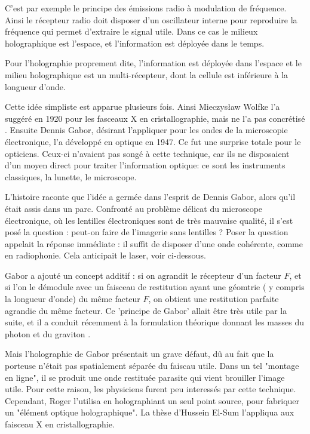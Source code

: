 \documentclass[a4paper,12pt]{article}
\begin{document}
C'est par exemple le principe des émissions radio à modulation de fréquence. Ainsi le récepteur radio doit disposer d'un oscillateur interne pour reproduire la fréquence qui permet d'extraire le signal utile. Dans ce cas le milieux holographique est l'espace, et l'information est déployée dans le temps.


Pour l'holographie proprement dite, l'information est déployée dans l'espace et le milieu holographique est un multi-récepteur, dont la cellule est inférieure à la longueur d'onde.


Cette idée simpliste est apparue plusieurs fois. Ainsi Mieczysław Wolfke l'a suggéré en 1920 pour les fasceaux X en cristallographie, mais ne l'a pas concrétisé \cite{Gabor}. Ensuite Dennis Gabor, désirant l'appliquer pour les ondes de la microscopie électronique, l'a développé en optique en 1947. Ce fut une surprise totale pour le opticiens. Ceux-ci n'avaient pas songé à cette technique, car ils ne disposaient d'un moyen direct pour traiter l'information optique: ce sont les instruments classiques, la lunette, le microscope.



L'histoire raconte que l'idée a germée dans l'esprit de Dennis Gabor, alors qu'il était assis dans un parc. Confronté au problème délicat du microscope électronique, où les lentilles électroniques sont de très mauvaise qualité, il s'est posé la question : peut-on faire de l'imagerie sans lentilles ? Poser la question appelait la réponse immédiate : il suffit de disposer d'une onde cohérente, comme en radiophonie. Cela anticipait le laser, voir ci-dessous.


Gabor a ajouté un concept additif : si on agrandit le récepteur d'un facteur $F$, et si l'on le démodule avec un faisceau de restitution ayant une géomtrie ( y compris la longueur d'onde) du même facteur $F$, on obtient une restitution parfaite agrandie du même facteur. Ce 'principe de Gabor' allait être très utile par la suite, et il a conduit récemment à la formulation théorique donnant les masses du photon et du graviton \cite{Sanchez}.



Mais l'holographie de Gabor présentait un grave défaut, dû au fait que la porteuse n'était pas spatialement séparée du faiscau utile. Dans un tel "montage en ligne", il se produit une onde restituée parasite qui vient brouiller l'image utile. Pour cette raison, les physiciens furent peu interessés par cette technique. Cependant, Roger l'utilisa en holographiant un seul point source, pour fabriquer un "élément optique holographique". La thèse d'Hussein El-Sum l'appliqua aux faisceau X en cristallographie. 
\end{document}
